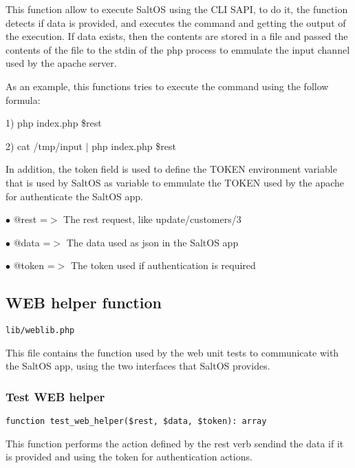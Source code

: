\documentclass[a4paper]{article}
\begin{document}
This function allow to execute SaltOS using the CLI SAPI, to do it, the function
detects if data is provided, and executes the command and getting the output of
the execution. If data exists, then the contents are stored in a file and passed
the contents of the file to the stdin of the php process to emmulate the input
channel used by the apache server.

As an example, this functions tries to execute the command using the follow formula:

1) php index.php \$rest

2) cat /tmp/input $|$ php index.php \$rest

In addition, the token field is used to define the TOKEN environment variable that
is used by SaltOS as variable to emmulate the TOKEN used by the apache for authenticate
the SaltOS app.

\begin{compactitem}
\item[\color{myblue}$\bullet$] @rest  =$>$ The rest request, like update/customers/3
\item[\color{myblue}$\bullet$] @data  =$>$ The data used as json in the SaltOS app
\item[\color{myblue}$\bullet$] @token =$>$ The token used if authentication is required
\end{compactitem}

\hypertarget{toc6}{}
\subsection{WEB helper function}

\begin{lstlisting}
lib/weblib.php
\end{lstlisting}

This file contains the function used by the web unit tests to communicate with the
SaltOS app, using the two interfaces that SaltOS provides.

\hypertarget{toc7}{}
\subsubsection{Test WEB helper}

\begin{lstlisting}
function test_web_helper($rest, $data, $token): array
\end{lstlisting}

This function performs the action defined by the rest verb sendind the data if it is
provided and using the token for authentication actions.
\end{document}
